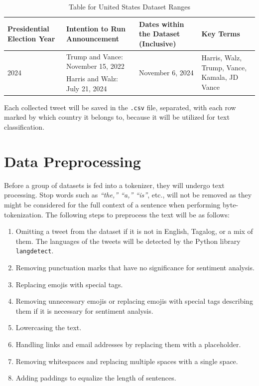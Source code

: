 \begin{table}[h]
    \centering
    \begin{tabularx}{\textwidth}{X|X|X|X}
        \textbf{Presidential Election Year} & \textbf{Intention to Run Announcement} & \textbf{Dates within the Dataset (Inclusive)} & \textbf{Key Terms}\\
        \hline\hline
        \multirow{2}{*}{2024}& Trump and Vance: November 15, 2022 & \multirow{2}{*}{November 6, 2024} & \multirow{2}{4cm}{Harris, Walz, Trump, Vance, Kamala, JD Vance} \\
        & Harris and Walz: July 21, 2024 & & \\
    \end{tabularx}
    \caption{Table for United States Dataset Ranges}
\end{table}


Each collected tweet will be saved in the \texttt{.csv} file, separated, with each row marked by which country it belongs to, because it will be utilized for text classification.

\section{Data Preprocessing}
Before a group of datasets is fed into a tokenizer, they will undergo text processing.  Stop words such as \emph{“the,” “a,” “is”}, etc., will not be removed as they might be considered for the full context of a sentence when performing byte-tokenization. The following steps to preprocess the text will be as follows:

\begin{enumerate}
    \item Omitting a tweet from the dataset if it is not in English, Tagalog, or a mix of them. The languages of the tweets will be detected by the Python library \texttt{langdetect}.
    \item Removing punctuation marks that have no significance for sentiment analysis.
    \item Replacing emojis with special tags.
    \item Removing unnecessary emojis or replacing emojis with special tags describing them if it is necessary for sentiment analysis.
    \item Lowercasing the text.
    \item Handling links and email addresses by replacing them with a placeholder.
    \item Removing whitespaces and replacing multiple spaces with a single space.
    \item Adding paddings to equalize the length of sentences.
\end{enumerate}

